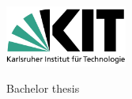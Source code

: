 \begin{titlepage}
    \includegraphics[width=4cm]{gfx/Logo_KIT.svg.png}
    \vspace*{2cm}

    \begin{center} \large

        Bachelor thesis
        \vspace*{2cm}

        \begingroup
        \color{CTtitle} \\ \bigskip
        \endgroup
        \vspace*{2.5cm}

        \spacedlowsmallcaps{\Large\myName}
        \vspace*{1.5cm}

        \myTime
        \vspace*{4.5cm}

        \mySupervisor\\[1cm]
        \myFaculty \\[1cm]
        \myUni \\ \bigskip

        \vfill

    \end{center}
\end{titlepage}
